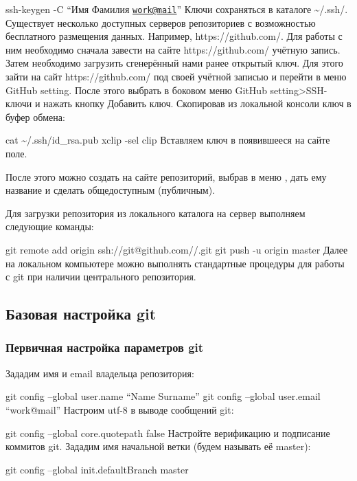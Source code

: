 \documentclass[
  english,
  russian,
  12pt,
  a4paper,
  DIV=11,
  numbers=noendperiod]{scrreprt}
\begin{document}
ssh-keygen -C \enquote{Имя Фамилия
\href{mailto:work@mail}{\nolinkurl{work@mail}}} Ключи сохраняться в
каталоге \textasciitilde/.ssh/. Существует несколько доступных серверов
репозиториев с возможностью бесплатного размещения данных. Например,
https://github.com/. Для работы с ним необходимо сначала завести на
сайте https://github.com/ учётную запись. Затем необходимо загрузить
сгенерённый нами ранее открытый ключ. Для этого зайти на сайт
https://github.com/ под своей учётной записью и перейти в меню GitHub
setting. После этого выбрать в боковом меню GitHub
setting\textgreater SSH-ключи и нажать кнопку Добавить ключ. Скопировав
из локальной консоли ключ в буфер обмена:

cat \textasciitilde/.ssh/id\_rsa.pub \textbar{} xclip -sel clip
Вставляем ключ в появившееся на сайте поле.

После этого можно создать на сайте репозиторий, выбрав в меню , дать ему
название и сделать общедоступным (публичным).

Для загрузки репозитория из локального каталога на сервер выполняем
следующие команды:

git remote add origin ssh://git@github.com//.git git push -u origin
master Далее на локальном компьютере можно выполнять стандартные
процедуры для работы с git при наличии центрального репозитория.

\subsection{Базовая настройка
git}\label{ux431ux430ux437ux43eux432ux430ux44f-ux43dux430ux441ux442ux440ux43eux439ux43aux430-git}

\subsubsection{Первичная настройка параметров
git}\label{ux43fux435ux440ux432ux438ux447ux43dux430ux44f-ux43dux430ux441ux442ux440ux43eux439ux43aux430-ux43fux430ux440ux430ux43cux435ux442ux440ux43eux432-git}

Зададим имя и email владельца репозитория:

git config --global user.name \enquote{Name Surname} git config --global
user.email \enquote{work@mail} Настроим utf-8 в выводе сообщений git:

git config --global core.quotepath false Настройте верификацию и
подписание коммитов git. Зададим имя начальной ветки (будем называть её
master):

git config --global init.defaultBranch master
\end{document}
